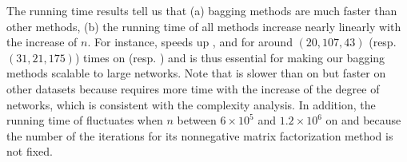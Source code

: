 The running time results tell us that (a) bagging methods are much faster than other methods,
(b) the running time of all methods increase nearly linearly with the increase of $n$. For
instance, \Biased speeds up \NMF, \Aa and \BIGCLAM for around $(20, 107, 43)$ (resp. $(31, 21, 175)$)
times on \Twitter (resp. \Friendster) and is thus essential for
making our bagging methods scalable to large networks. Note
that \NMF is slower than \BIGCLAM on \YouTube but faster on other datasets
because \BIGCLAM requires more time with the increase of the degree of networks,
which is consistent with the complexity analysis.
In addition, the running time of \BIGCLAM fluctuates when
$n$ between $6\times 10^5$ and $1.2\times 10^6$ on \YouTube and \Flickr because the number of
the iterations for its nonnegative matrix factorization method is not fixed.


